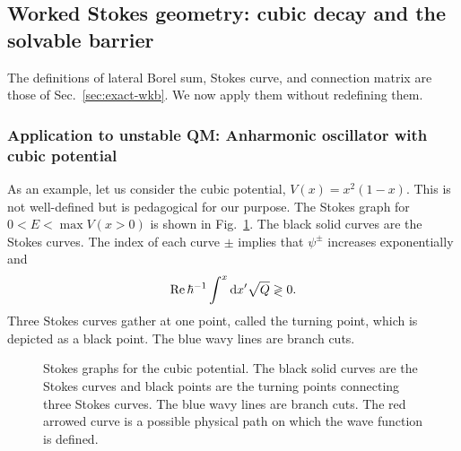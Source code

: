 \subsection{Worked Stokes geometry: cubic decay and the solvable barrier}
The definitions of lateral Borel sum, Stokes curve, and connection matrix are
those of Sec.~\ref{sec:exact-wkb}.  We now apply them without redefining them.
\subsubsection{Application to unstable QM: Anharmonic oscillator with cubic potential}
As an example, let us consider the cubic potential, $V(x) = x^2(1-x)$.
This is not well-defined but is pedagogical for our purpose.
The Stokes graph for~$0<E<\max V(x>0)$ is shown in Fig.~\ref{src:2503_18741:fig:cubic}.
The black solid curves are the Stokes curves.
The index of each curve $\pm$ implies that $\psi^{\pm}$ increases exponentially and
\begin{align}
    \operatorname{Re} \hbar^{-1} \int^x \mathrm{d} x' \sqrt{Q} \gtrless 0.
\end{align}
Three Stokes curves gather at one point, called the turning point, which is depicted as a black point.
The blue wavy lines are branch cuts.
\begin{figure}
    \centering
{}
    \caption{Stokes graphs for the cubic potential.
    The black solid curves are the Stokes curves
    and black points are the turning points connecting three Stokes curves.
    The blue wavy lines are branch cuts.
    The red arrowed curve is a possible physical path on which the wave function is defined.}
    \label{src:2503_18741:fig:cubic}
\end{figure}
